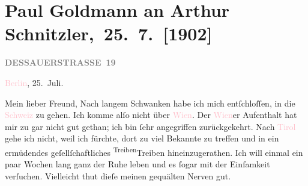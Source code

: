 

\renewcommand{\erwaehntePersonen}{Personen: Otto Brahm, Raphael Löwenfeld, Walther Rathenau, Olga Schnitzler, Elisabeth Steinrück}
\renewcommand{\erwaehnteInstitutionen}{Institutionen: S. Hirzel Verlag (Leipzig), Schiller-Theater}
\renewcommand{\erwaehnteOrte}{Orte: Berlin, Dessauer Straße, Kaltenleutgeben, Leipzig, Schweiz, Tirol, Wien}
\renewcommand{\erwaehnteWerke}{Werke: Der Schleier der Beatrice. Schauspiel in fünf Akten, Impressionen}
\section[ Paul Goldmann an Arthur Schnitzler, 25. 7. {[}1902{]}]{Paul Goldmann an Arthur Schnitzler, 25. 7. {[}1902{]}}
\nopagebreak{}
\rehead{ }\normalsize\beginnumbering{}
\toendnotes[C]{\smallbreak\pagebreak[2]}
\toendnotes[C]{\smallbreak}
\pstart
           \noindent{}\raggedleft{}{\pb}\textcolor{pink}{\textcolor{gray}{\textbf{DESSAUERSTRASSE 19}}}{}\ledrightnote{\textcolor{pink}{Dessauer Straße}}\pend
           
\pstart
           \textcolor{pink}{Berlin}{}\ledrightnote{\textcolor{pink}{Berlin}}, 25. Juli.\pend
           
\pstart\center{}Mein lieber Freund,\pend
\pstart
           Nach langem Schwanken habe ich mich entſchloſſen, in die \textcolor{pink}{Schweiz}{}\ledrightnote{\textcolor{pink}{Schweiz}} zu gehen. Ich komme alſo nicht über \textcolor{pink}{Wien}{}\ledrightnote{\textcolor{pink}{Wien}}. Der \textcolor{pink}{Wien}{}\ledrightnote{\textcolor{pink}{Wien}}er Aufenthalt
               hat mir zu \label{K_L03214-1v}\label{K_L03214-1h} gar nicht gut gethan; ich  bin ſehr angegriffen zurückgekehrt. Nach \textcolor{pink}{Tirol}{}\ledrightnote{\textcolor{pink}{Tirol}} gehe ich nicht, weil ich fürchte, dort zu
               viel Bekannte zu treffen und in ein ermüdendes geſellſchaftliches {\pb}\substVorne{}\textsuperscript{Treiben}{\allowbreak}\substDazwischen{}Treiben\substHinten{} hineinzugerathen. Ich will einmal ein paar Wochen lang ganz der Ruhe leben
               und es ſogar mit der Einſamkeit verſuchen. Vielleicht thut dieſe meinen gequälten
               Nerven gut.\pend
           
